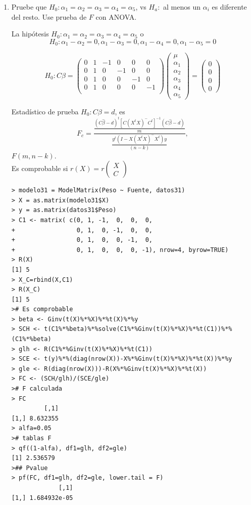 \documentclass[12pt,a4paper]{report}
\begin{document}
\begin{enumerate}


\item[a.] Pruebe que $H_0: \alpha_1 = \alpha_2 = \alpha_3 = \alpha_4 = \alpha_5$, vs $H_a:$ al menos un $\alpha_i$ es diferente del resto. Use prueba de $F$ con ANOVA.


La hipótesis $H_0: \alpha_1 = \alpha_2 = \alpha_3 = \alpha_4 = \alpha_5$ o
\[H_0: \alpha_1 - \alpha_2 = 0, \alpha_1 - \alpha_3 = 0, \alpha_1 - \alpha_4 = 0, \alpha_1 - \alpha_5 = 0 \]

\[H_0: C\beta = \begin{pmatrix}
0 & 1 & -1 & 0 & 0 & 0 \\
0 & 1 & 0 & -1 & 0 & 0 \\
0 & 1 & 0 & 0 & -1 & 0 \\
0 & 1 & 0 & 0 & 0 & -1 \\
\end{pmatrix}
\begin{pmatrix}
\mu \\ \alpha_1 \\ \alpha_2 \\ \alpha_3 \\ \alpha_4 \\ \alpha_5
\end{pmatrix} = \begin{pmatrix}
0 \\ 0 \\ 0 \\ 0
\end{pmatrix}\]

Estadístico de prueba $H_0 : C\beta = d$, es 
\[F_c = \frac{\frac{(C\widehat{\beta}-d)^t[C(X^tX)^{-}C^t]^{-1}(C\widehat{\beta}-d)}{m}}{\frac{y^t(I - X(X^tX)^{-}X^t)y}{(n-k)}},\]
$F(m, n-k)$.\\


Es comprobable si $r(X)=r\begin{pmatrix} X \\ C \end{pmatrix}$


\begin{verbatim}
> modelo31 = ModelMatrix(Peso ~ Fuente, datos31)
> X = as.matrix(modelo31$X)
> y = as.matrix(datos31$Peso)
> C1 <- matrix( c(0, 1, -1,  0,  0,  0,
+                 0, 1,  0, -1,  0,  0,
+                 0, 1,  0,  0, -1,  0,
+                 0, 1,  0,  0,  0, -1), nrow=4, byrow=TRUE)
> R(X)
[1] 5
> X_C=rbind(X,C1)
> R(X_C)
[1] 5
># Es comprobable
> beta <- Ginv(t(X)%*%X)%*%t(X)%*%y
> SCH <- t(C1%*%beta)%*%solve(C1%*%Ginv(t(X)%*%X)%*%t(C1))%*%(C1%*%beta)
> glh <- R(C1%*%Ginv(t(X)%*%X)%*%t(C1))
> SCE <- t(y)%*%(diag(nrow(X))-X%*%Ginv(t(X)%*%X)%*%t(X))%*%y
> gle <- R(diag(nrow(X)))-R(X%*%Ginv(t(X)%*%X)%*%t(X))
> FC <- (SCH/glh)/(SCE/gle)
># F calculada
> FC                                         
         [,1]
[1,] 8.632355
> alfa=0.05
># tablas F
> qf((1-alfa), df1=glh, df2=gle)             
[1] 2.536579
>## Pvalue
> pf(FC, df1=glh, df2=gle, lower.tail = F)   
             [,1]
[1,] 1.684932e-05
\end{verbatim}



\end{enumerate}
\end{document}
